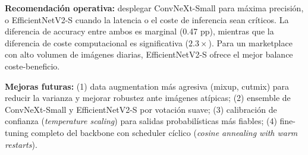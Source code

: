 \documentclass[11pt,a4paper]{article}
\begin{document}
\textbf{Recomendación operativa:} desplegar ConvNeXt-Small para máxima precisión, o EfficientNetV2-S cuando la latencia o el coste de inferencia sean críticos. La diferencia de accuracy entre ambos es marginal (0.47 pp), mientras que la diferencia de coste computacional es significativa ($2.3\times$). Para un marketplace con alto volumen de imágenes diarias, EfficientNetV2-S ofrece el mejor balance coste-beneficio.

\textbf{Mejoras futuras:} (1) data augmentation más agresiva (mixup, cutmix) para reducir la varianza y mejorar robustez ante imágenes atípicas; (2) ensemble de ConvNeXt-Small y EfficientNetV2-S por votación suave; (3) calibración de confianza (\textit{temperature scaling}) para salidas probabilísticas más fiables; (4) fine-tuning completo del backbone con scheduler cíclico (\textit{cosine annealing with warm restarts}).
\end{document}
